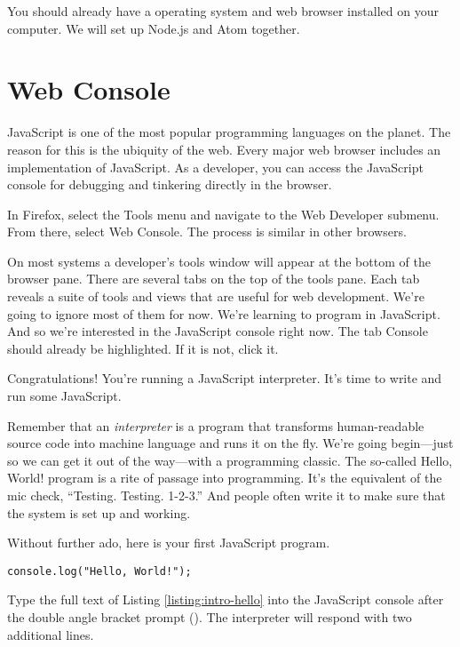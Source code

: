You should already have a operating system and web browser installed on your computer. We will set up Node.js and Atom together.

\section{Web Console}
JavaScript is one of the most popular programming languages on the planet. The reason for this is the ubiquity of the web. Every major web browser includes an implementation of JavaScript. As a developer, you can access the JavaScript console for debugging and tinkering directly in the browser.

In Firefox, select the \textsf{Tools} menu and navigate to the \textsf{Web Developer} submenu. From there, select \textsf{Web Console}. The process is similar in other browsers.

On most systems a developer's tools window will appear at the bottom of the browser pane. There are several tabs on the top of the tools pane. Each tab reveals a suite of tools and views that are useful for web development. We're going to ignore most of them for now. We're learning to program in JavaScript. And so we're interested in the JavaScript console right now. The tab \textsf{Console} should already be highlighted. If it is not, click it.

Congratulations! You're running a JavaScript interpreter. It's time to write and run some JavaScript.

Remember that an \emph{interpreter} is a program that transforms human-readable source code into machine language and runs it on the fly. We're going begin---just so we can get it out of the way---with a programming classic. The so-called \textsf{Hello, World!} program is a rite of passage into programming. It's the equivalent of the mic check, ``Testing. Testing. 1-2-3.'' And people often write it to make sure that the system is set up and working.

Without further ado, here is your first JavaScript program.

\suppresslinenumbers
\begin{lstlisting}[caption={\label{listing:intro-hello}Hello, World! It's good to see you.}]
console.log("Hello, World!");
\end{lstlisting}

Type the full text of Listing \ref{listing:intro-hello} into the JavaScript console after the double angle bracket prompt (\prompt). The interpreter will respond with two additional lines.

